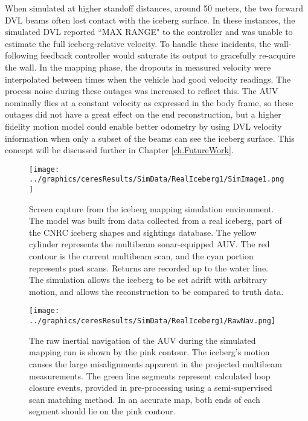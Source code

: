 When simulated at higher standoff distances, around 50 meters, the two forward DVL beams often lost contact with the iceberg surface. In these instances, the simulated DVL reported ``MAX RANGE" to the controller and was unable to estimate the full iceberg-relative velocity. To handle these incidents, the wall-following feedback controller would saturate its output to gracefully re-acquire the wall. In the mapping phase, the dropouts in measured velocity were interpolated between times when the vehicle had good velocity readings. The process noise during these outages was increased to reflect this. The AUV nominally flies at a constant velocity as expressed in the body frame, so these outages did not have a great effect on the end reconstruction, but a higher fidelity motion model could enable better odometry by using DVL velocity information when only a subset of the beams can see the iceberg surface. This concept will be discussed further in Chapter \ref{ch.FutureWork}.

 \begin{figure}[htbp]
   \centering
   \texttt{[image: ../graphics/ceresResults/SimData/RealIceberg1/SimImage1.png]} %
   \caption{Screen capture from the iceberg mapping simulation environment. The model was built from data collected from a real iceberg, part of the CNRC iceberg shapes and sightings database. The yellow cylinder represents the multibeam sonar-equipped AUV. The red contour is the current multibeam scan, and the cyan portion represents past scans. Returns are recorded up to the water line. The simulation allows the iceberg to be set adrift with arbitrary motion, and allows the reconstruction to be compared to truth data.}
   \label{fig:IcebergSim}
\end{figure}

 \begin{figure}[htbp]
   \centering
   \texttt{[image: ../graphics/ceresResults/SimData/RealIceberg1/RawNav.png]} %
   \caption{The raw inertial navigation of the AUV during the simulated mapping run is shown by the pink contour. The iceberg's motion causes the large misalignments apparent in the projected multibeam measurements. The green line segments represent calculated loop closure events, provided in pre-processing using a semi-supervised scan matching method. In an accurate map, both ends of each segment should lie on the pink contour.}
   \label{fig:RawNav}
\end{figure}


